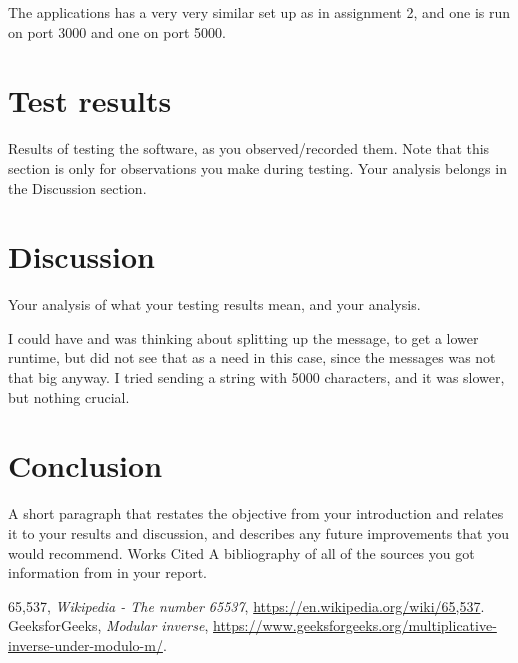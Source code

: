\documentclass[12pt, letterpaper]{article}
\begin{document}
The applications has a very very similar set up as in assignment 2, and one is run on port 3000 and one on port 5000. 

\section*{Test results}
Results of testing the software, as you observed/recorded them. Note that this section is only for observations you
make during testing. Your analysis belongs in the Discussion section. 

\section*{Discussion}
Your analysis of what your testing results mean, and your analysis.

I could have and was thinking about splitting up the message, to get a lower runtime, but did not see that as a need in this case, since the messages was not that big anyway. I tried sending a string with 5000 characters, and it was slower, but nothing crucial.

\section*{Conclusion}
A short paragraph that restates the objective from your introduction and relates it to your results and discussion, and
describes any future improvements that you would recommend. Works Cited A bibliography of all of the sources
you got information from in your report. 


\begin{thebibliography}{10} 
 65,537,  \emph{Wikipedia - The number 65537},
\url{https://en.wikipedia.org/wiki/65,537}.
 GeeksforGeeks,  \emph{Modular inverse},
\url{https://www.geeksforgeeks.org/multiplicative-inverse-under-modulo-m/}.
\end{thebibliography}
\end{document}
